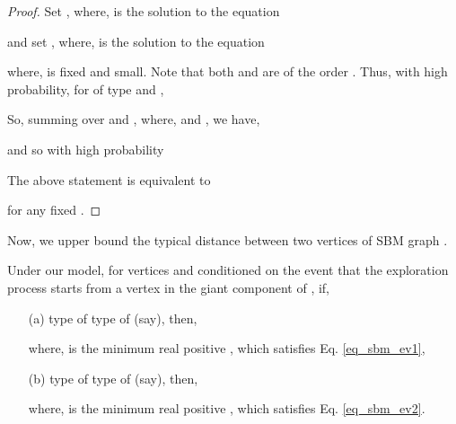 \documentclass[graybox]{svmult}
\begin{document}
\begin{proof}
Set , where,  is the solution to the equation

and set , where,  is the solution to the equation

where,  is fixed and small. Note that both  and  are of the order . Thus, with high probability, for  of type  and ,

So, summing over  and , where,  and , we have, 

and so with high probability

The above statement is equivalent to

for any fixed . 
\end{proof}



Now, we upper bound the typical distance between two vertices of SBM graph .


\begin{lemma}
\label{lm_up_bnd2}
Under our model, for vertices  and conditioned on the event that the exploration process starts from a vertex in the giant component of , if, 
\begin{itemize}
\item[(a)] \hspace{0.05in} type of  type of  (say), then, 

where,  is the minimum real positive , which satisfies Eq. \eqref{eq_sbm_ev1},
\item[(b)] \hspace{0.05in} type of  type of  (say), then, 

where,  is the minimum real positive , which satisfies Eq. \eqref{eq_sbm_ev2}.
\end{itemize}
\end{lemma}
\end{document}
